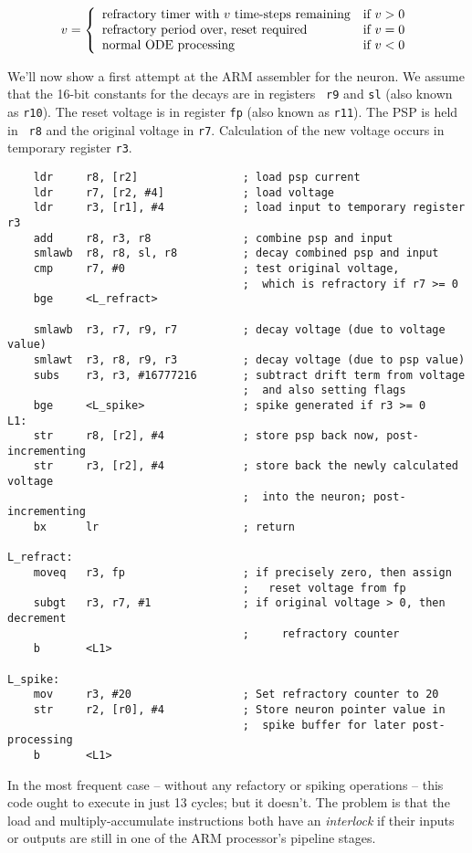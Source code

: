 \begin{equation}
v = \left\{\begin{array}[c]{ll}
\mbox{refractory timer with $v$ time-steps remaining} &\mbox{if $v > 0$}\\
\mbox{refractory period over, reset required} &\mbox{if $v = 0$}\\
\mbox{normal ODE processing}&\mbox{if $v < 0$}\\
\end{array}\right.
\end{equation}

We'll now show a first attempt at the ARM assembler for the neuron. We
assume that the 16-bit constants for the decays are in registers {\tt
  r9} and {\tt sl} (also known as {\tt r10}). The reset voltage is in
register {\tt fp} (also known as {\tt r11}). The PSP is held in {\tt
  r8} and the original voltage in {\tt r7}. Calculation of the new
voltage occurs in temporary register {\tt r3}.
\begin{verbatim}
    ldr     r8, [r2]                ; load psp current
    ldr     r7, [r2, #4]            ; load voltage
    ldr     r3, [r1], #4            ; load input to temporary register r3
    add     r8, r3, r8              ; combine psp and input
    smlawb  r8, r8, sl, r8          ; decay combined psp and input
    cmp     r7, #0                  ; test original voltage,
                                    ;  which is refractory if r7 >= 0
    bge     <L_refract>

    smlawb  r3, r7, r9, r7          ; decay voltage (due to voltage value)
    smlawt  r3, r8, r9, r3          ; decay voltage (due to psp value)
    subs    r3, r3, #16777216       ; subtract drift term from voltage
                                    ;  and also setting flags
    bge     <L_spike>               ; spike generated if r3 >= 0
L1:
    str     r8, [r2], #4            ; store psp back now, post-incrementing
    str     r3, [r2], #4            ; store back the newly calculated voltage 
                                    ;  into the neuron; post-incrementing
    bx      lr                      ; return

L_refract:
    moveq   r3, fp                  ; if precisely zero, then assign
                                    ;   reset voltage from fp
    subgt   r3, r7, #1              ; if original voltage > 0, then decrement
                                    ;     refractory counter
    b       <L1>

L_spike:
    mov     r3, #20                 ; Set refractory counter to 20
    str     r2, [r0], #4            ; Store neuron pointer value in
                                    ;  spike buffer for later post-processing
    b       <L1>
\end{verbatim}
In the most frequent case -- without any refactory or spiking
operations -- this code ought to execute in just 13 cycles; but it
doesn't. The problem is that the load and multiply-accumulate
instructions both have an {\em interlock} if their inputs or outputs
are still in one of the ARM processor's pipeline stages.

